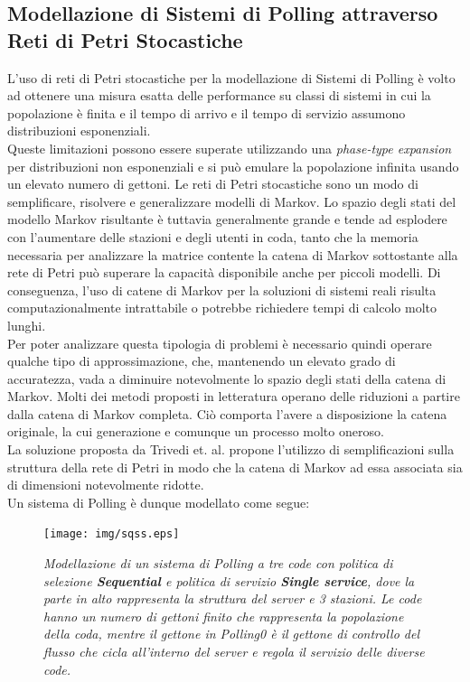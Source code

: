 \documentclass[12pt,a4paper,italian]{article}
\begin{document}
\subsection{Modellazione di Sistemi di Polling attraverso Reti di Petri Stocastiche}
L'uso di reti di Petri stocastiche per la modellazione di Sistemi di Polling è volto ad ottenere una misura esatta delle performance su classi di sistemi in cui la popolazione è finita e il tempo di arrivo e il tempo di servizio assumono distribuzioni esponenziali.\\ Queste limitazioni possono essere superate utilizzando una \emph{phase-type expansion} per distribuzioni non esponenziali e si può emulare la popolazione infinita usando un elevato numero di gettoni\cite{fixedpoint}. Le reti di Petri stocastiche sono un modo di semplificare, risolvere e generalizzare modelli di Markov. Lo spazio degli stati del modello Markov risultante è tuttavia generalmente grande e tende ad esplodere con l'aumentare delle stazioni e degli utenti in coda, tanto che la memoria necessaria per analizzare la matrice contente la catena di Markov sottostante alla rete di Petri può superare la capacità disponibile anche per piccoli modelli. Di conseguenza, l'uso di catene di Markov per la soluzioni di sistemi reali risulta computazionalmente intrattabile o potrebbe richiedere tempi di calcolo molto lunghi\cite{pollingsys}.\\
Per poter analizzare questa tipologia di problemi è necessario quindi operare qualche tipo di approssimazione, che, mantenendo un elevato grado di accuratezza, vada a diminuire notevolmente lo spazio degli stati della catena di Markov. Molti dei metodi proposti in letteratura operano delle riduzioni a partire dalla catena di Markov completa. Ciò comporta l'avere a disposizione la catena originale, la cui generazione e comunque un processo molto oneroso.\\ La soluzione proposta da Trivedi et. al. propone l'utilizzo di semplificazioni sulla struttura della rete di Petri in modo che la catena di Markov ad essa associata sia di dimensioni notevolmente ridotte.\\
\newline
Un sistema di Polling è dunque modellato come segue:\\
\begin{figure}[!h]
	\centering
	\texttt{[image: img/sqss.eps]}
	\caption{\emph{Modellazione di un sistema di Polling a tre code con politica di selezione \textbf{Sequential} e politica di servizio \textbf{Single service}, dove la parte in alto rappresenta la struttura del server e 3 stazioni. Le code hanno un numero di gettoni finito che rappresenta la popolazione della coda, mentre il gettone in Polling0 è il gettone di controllo del flusso che cicla all'interno del server e regola il servizio delle diverse code.}}
	\label{sqss}
\end{figure}\\
\end{document}
